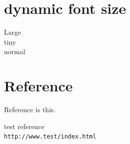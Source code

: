 \documentclass[10pt]{jsarticle}
\begin{document}
\section{dynamic font size}
\noindent \Large Large\\
\tiny tiny\\
\normalsize normal\\

\section{Reference}
Reference is this\cite{test}.

\begin{thebibliography}{99}
test reference\\
\verb|http://www.test/index.html|
\end{thebibliography}
\end{document}
